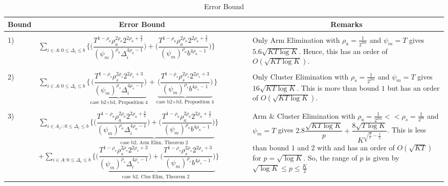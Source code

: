 \begin{remark}
\begin{table}
\caption{Error Bound}
\label{App:E:table:3}
\begin{center}
\begin{tabular}{p{0.5cm}p{11cm}p{5cm}}
\multicolumn{1}{c}{\bf Bound} &\multicolumn{1}{c}{\bf Error Bound} &\multicolumn{1}{c}{\bf Remarks} \\
\hline \\
1)	&$\sum_{i\in A:0\leq\Delta_{i}\leq b}\bigg\lbrace\bigg(\dfrac{T^{1-\rho_{a}}\rho_{a}^{2\rho_{a}}2^{2\rho_{a}+\frac{3}{2}}}{(\psi_{m})^{\rho_{a}}\Delta_{i}^{4\rho_{a} -1}} \bigg) + \bigg( \dfrac{T^{1-\rho_{a}}\rho_{a}^{2\rho_{a}}2^{2\rho_{a}+\frac{3}{2}}}{(\psi_{m})^{\rho_{a}}b^{4\rho_{a} -1}} \bigg)\bigg\rbrace$ &Only Arm Elimination with $\rho_{a}=\frac{1}{2^{2m}}$ and $\psi_{m}=T$ gives $5.6\sqrt{KT\log K}$. Hence, this has an order of $O(\sqrt{KT\log K})$.\\
\hline\\
2)	&$\sum_{i\in A:0\leq\Delta_{i}\leq b}\bigg\lbrace\underbrace{\bigg(\dfrac{T^{1-\rho_{s}}\rho_{s}^{2\rho_{s}}2^{2\rho_{s}+3}}{(\psi_{m})^{\rho_{s}}\Delta_{i}^{4\rho_{s} -1}} \bigg)}_{\text{case b2+b3, Proposition 4}} +\underbrace{\bigg(\dfrac{T^{1-\rho_{s}}\rho_{s}^{2\rho_{s}}2^{2\rho_{s}+3}}{(\psi_{m})^{\rho_{s}}b^{4\rho_{s} -1}} \bigg)}_{\text{case b2+b3, Proposition 4}}\bigg\rbrace$ &Only Cluster Elimination with $\rho_{s}=\frac{1}{2^{2m}}$ and $\psi_{m}=T$ gives $16\sqrt{KT\log K}$. This is more than bound $1$ but has an order of $O(\sqrt{KT\log K})$.\\
\hline\\
3)	&$\sum_{i\in A_{s^{*}}:0\leq\Delta_{i}\leq b}\bigg\lbrace \underbrace{\bigg(\dfrac{T^{1-\rho_{a}}\rho_{a}^{2\rho_{a}}2^{2\rho_{a}+\frac{3}{2}}}{(\psi_{m})^{\rho_{a}}\Delta_{i}^{4\rho_{a}-1}} \bigg)+\bigg(\dfrac{T^{1-\rho_{a}}\rho_{a}^{2\rho_{a}}2^{2\rho_{a}+\frac{3}{2}}}{(\psi_{m})^{\rho_{a}}b^{4\rho_{a} -1}} \bigg)}_{\text{case b2, Arm Elim, Theorem 2}}\bigg\rbrace $\newline$+ \sum_{i\in A:0\leq\Delta_{i}\leq b}\bigg\lbrace\underbrace{\bigg(\dfrac{T^{1-\rho_{s}}\rho_{s}^{2\rho_{s}}2^{2\rho_{s}+3}}{(\psi_{m})^{\rho_{s}}\Delta_{i}^{4\rho_{s}-1}} \bigg)+\bigg(\dfrac{T^{1-\rho_{s}}\rho_{s}^{2\rho_{s}}2^{2\rho_{s}+3}}{(\psi_{m})^{\rho_{s}}b^{4\rho_{s} -1}} \bigg)}_{\text{case b2, Clus Elim, Theorem 2}} \bigg\rbrace$ & Arm \& Cluster Elimination with $\rho_{a}=\frac{1}{2^{2m}} << \rho_{s}=\frac{1}{2^{m}}$ and $\psi_{m}=T$ gives $2.8\dfrac{\sqrt{KT\log K}}{p} +\dfrac{8\sqrt{T\log K}}{K^{\sqrt{\frac{T}{e}}-\frac{1}{2}}}$. This is less than bound $1$ and $2$ with and has an order of $O(\sqrt{KT})$ for $p=\sqrt{\log K}$. So, the range of $p$ is given by $\sqrt{\log K}\leq p\leq \frac{K}{2}$

\end{tabular}
\end{center}
\end{table}
\end{remark}
